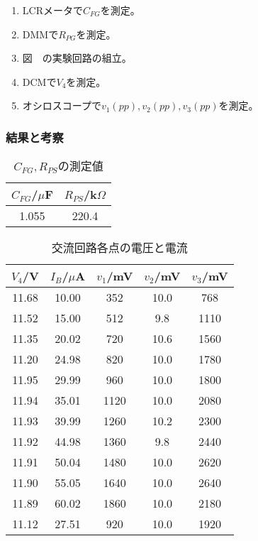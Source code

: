 \documentclass[11pt,a4j,titlepage]{jsarticle}
\begin{document}
  \begin{enumerate}
   \item LCRメータで$C_{FG}$を測定。
   \item DMMで$R_{PG}$を測定。
   \item 図\ \ の実験回路の組立。
   \item DCMで$V_4$を測定。
   \item オシロスコープで$v_1(pp),v_2(pp),v_3(pp)$を測定。
  \end{enumerate}

  
  
   \subsubsection{結果と考察}
   
   
 
 \begin{table}[htb]
  \begin{center}
    \caption{$C_{FG},R_{PS}$の測定値}
    \begin{tabular}{cc} \toprule
$C_{FG}$/$\mu$F & $R_{PS}$/k$\Omega$ \\ \midrule
1.055 & 220.4 \\ \bottomrule
    \end{tabular}
    \label{tab:price}
  \end{center}
\end{table}
 
   
 
 \begin{table}[htb]
  \begin{center}
    \caption{交流回路各点の電圧と電流}
    \begin{tabular}{ccccc} \toprule
$V_4$/V	&	$I_B$/$\mu$A	&	$v_1$/mV	&	$v_2$/mV	&	$v_3$/mV	\\ \midrule
11.68	&	10.00	&	352	&	10.0	&	768	\\
11.52	&	15.00	&	512	&	9.8	&	1110	\\
11.35	&	20.02	&	720	&	10.6	&	1560	\\
11.20	&	24.98	&	820	&	10.0	&	1780	\\
11.95	&	29.99	&	960	&	10.0	&	1800	\\
11.94	&	35.01	&	1120	&	10.0	&	2080	\\
11.93	&	39.99	&	1260	&	10.2	&	2300	\\
11.92	&	44.98	&	1360	&	9.8	&	2440	\\
11.91	&	50.04	&	1480	&	10.0	&	2620	\\
11.90	&	55.05	&	1640	&	10.0	&	2640	\\
11.89	&	60.02	&	1860	&	10.0	&	2180	\\
11.12	&	27.51	&	920	&	10.0	&	1920	\\ \bottomrule
    \end{tabular}
    \label{tab:price}
  \end{center}
\end{table}
\end{document}

